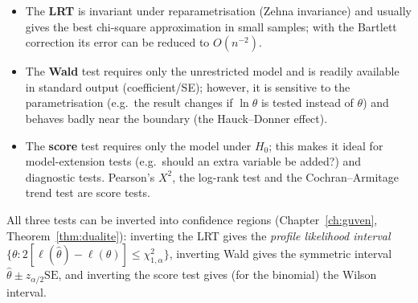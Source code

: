 \documentclass[main.tex]{subfiles}
\begin{document}
\begin{remark}
\begin{itemize}
  \item The \textbf{LRT} is invariant under reparametrisation (Zehna invariance) and usually gives the best chi-square approximation in small samples; with the Bartlett correction its error can be reduced to $O(n^{-2})$.
  \item The \textbf{Wald} test requires only the unrestricted model and is readily available in standard output (coefficient/SE); however, it is sensitive to the parametrisation (e.g.\ the result changes if $\ln\theta$ is tested instead of $\theta$) and behaves badly near the boundary (the Hauck--Donner effect).
  \item The \textbf{score} test requires only the model under $H_0$; this makes it ideal for model-extension tests (e.g.\ should an extra variable be added?) and diagnostic tests. Pearson's $X^2$, the log-rank test and the Cochran--Armitage trend test are score tests.
\end{itemize}
\end{remark}

\begin{remark}
All three tests can be inverted into confidence regions (Chapter~\ref{ch:guven}, Theorem~\ref{thm:dualite}): inverting the LRT gives the \emph{profile likelihood interval} $\{\theta:2[\ell(\hat\theta)-\ell(\theta)]\le\chi^2_{1,\alpha}\}$, inverting Wald gives the symmetric interval $\hat\theta\pm z_{\alpha/2}\mathrm{SE}$, and inverting the score test gives (for the binomial) the Wilson interval.
\end{remark}

\end{document}
